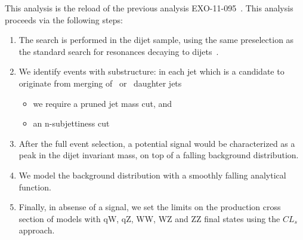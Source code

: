 This analysis is the reload of the previous analysis EXO-11-095~\cite{ref_2011}.  
This analysis proceeds via the following steps:
\begin{enumerate}
\item The search is performed in the dijet sample, using the same
      preselection as the standard search for resonances decaying to 
      dijets~\cite{cmsdijet}.

\item We identify events with substructure: in each jet which is a candidate
    to originate from merging of \wboson\ or \zboson\ daughter jets
  \begin{itemize}
  \item we require a pruned jet mass cut, and
  \item an n-subjettiness cut
  \end{itemize}

\item After the full event selection, a potential signal would be characterized as
    a peak in the dijet invariant mass, on top of a falling background distribution.

\item We model the background distribution with a smoothly falling 
  analytical function.

\item Finally, in absense of a signal, we set the limits on the production cross section of
  models with qW, qZ, WW, WZ and ZZ final states using the $CL_s$ approach.

\end{enumerate}
